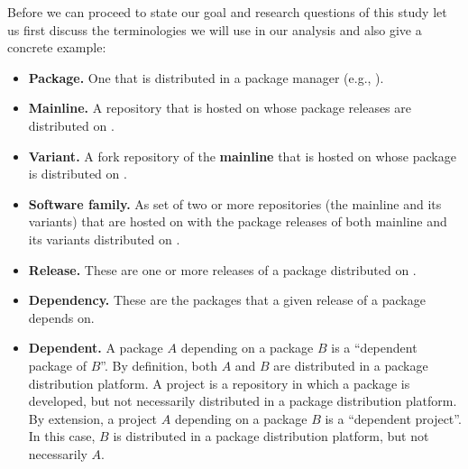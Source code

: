 Before we can proceed to state our goal and research questions of this study let us first discuss the terminologies we will use in our analysis and also give a concrete example: 

\begin{itemize}
    \item \textbf{Package.} One that is distributed in a package manager (e.g., \np).
    
    \item \textbf{Mainline.} A repository that is hosted on \gh 
    whose package releases are distributed on \npm.

    \item \textbf{Variant.} A fork repository of the \textbf{mainline} that is hosted on \gh whose package is distributed on \npm.

    \item \textbf{Software family.} As set of two or more repositories (the mainline and its variants) that are hosted on \gh with the package releases of both mainline and its variants distributed on \npm.

    
    \item \textbf{Release.} These are one or more releases of a package distributed on \npm.

     \item \textbf{Dependency.} These are the packages that a given release of a package depends on.

    \item \textbf{Dependent.}  A package $A$ depending on a package $B$ is a ``dependent package of $B$''. By definition, both $A$ and $B$ are distributed in a package distribution platform.  A project is a repository in which a package is developed, but not necessarily distributed in a package distribution platform. By extension, a project $A$ depending on a package $B$ is a ``dependent project''. In this case, $B$ is distributed in a package distribution platform, but not necessarily $A$.

\end{itemize}


